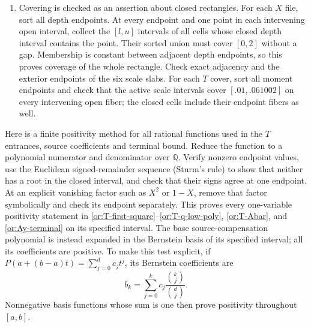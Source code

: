 \documentclass[11pt,reqno]{amsart}
\numberwithin{equation}{section}
\theoremstyle{definition}
\theoremstyle{remark}
\begin{document}
\begin{enumerate}
  lower-minus-upper reserve.  Each depth cell must have its rounded lower depth strictly
  greater than $t_+$.  Each low-field exclusion must have $H\ge600$.
  Each pair cell must satisfy $0<r<1$, $R>0$, $0<m<1$, $\delta>0$, $I_\Sigma>0$,
  both inset gates, both endpoint chord inequalities, its squared
  radical enclosure, and the strict
  comparison \eqref{or:pair-lower}--\eqref{or:T-pair-upper}.
\item Covering is checked as an assertion about closed rectangles.
  For each $X$ file, sort all depth endpoints.  At every endpoint
  and one point in each intervening open interval, collect the
  $[l,u]$ intervals of all cells whose closed depth interval contains
  the point.  Their sorted union must cover $[0,2]$ without a gap.
  Membership is constant between adjacent depth endpoints, so this
  proves coverage of the whole rectangle.  Check exact adjacency
  and the exterior endpoints of the six scale slabs.  For each
  $T$ cover, sort all moment endpoints and check that the active
  scale intervals cover $[.01,.061002]$ on every intervening open
  fiber; the closed cells include their endpoint fibers as well.
\end{enumerate}

Here is a finite positivity method for all rational functions used in
the $T$ entrances, source coefficients and terminal bound.  Reduce the
function to a polynomial numerator and denominator over $\mathbb Q$.
Verify nonzero endpoint values, use the Euclidean signed-remainder
sequence (Sturm's rule) to show that neither has a root in the closed
interval, and check that their signs agree at one endpoint.  At an
explicit vanishing factor such as $X^2$ or $1-X$, remove that factor
symbolically and check its endpoint separately.  This proves every
one-variable positivity statement in
\eqref{or:T-first-square}--\eqref{or:T-q-low-poly},
\eqref{or:T-Abar}, and \eqref{or:Ay-terminal} on its specified
interval.  The base source-compensation polynomial is instead
expanded in the Bernstein basis of its specified interval; all its
coefficients are positive.  To make this test explicit, if
$P(a+(b-a)t)=\sum_{j=0}^d c_jt^j$, its Bernstein coefficients are
\[
                   b_k=\sum_{j=0}^k c_j
                                   \frac{\binom{k}{j}}{\binom{d}{j}}.
\]
Nonnegative basis functions whose sum is one then prove positivity
throughout $[a,b]$.
\end{document}
